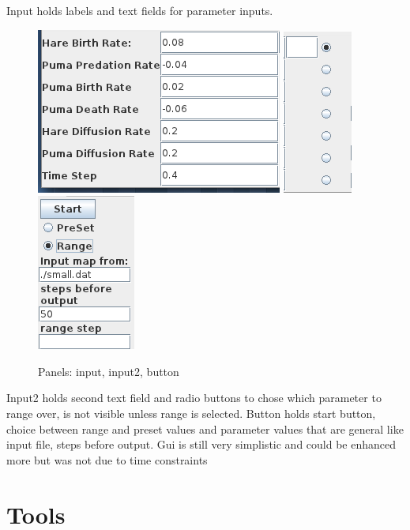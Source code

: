 \documentclass[11pt]{report}
\begin{document}
Input holds labels and text fields for parameter inputs. 
\begin{figure} [input]
\begin{center}
\includegraphics[scale = 0.5]{figs/input.png}
\includegraphics[scale = 0.5]{figs/input2.png}
\includegraphics[scale = 0.5]{figs/button.png}
\caption{Panels: input, input2, button}
\label{fig:input}
\end{center}
\end{figure}
Input2 holds second text field and radio buttons to chose which parameter to range over, is not visible unless range is selected. 
Button holds start button, choice between range and preset values and parameter values that are general like input file, steps before output.
Gui is still very simplistic and could be enhanced more but was not due to time constraints
   
   \section{Tools}
   
\end{document}

